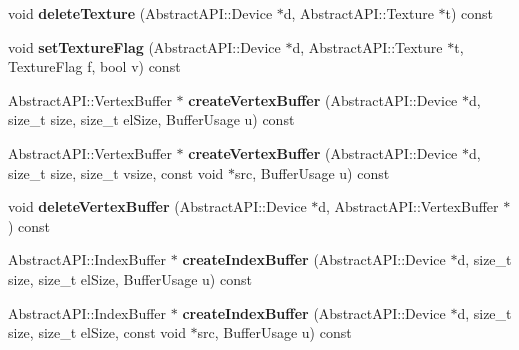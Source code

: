 \begin{DoxyCompactItemize}
\item 
\hypertarget{class_tempest_1_1_opengl2x_a1e61e5565ae0d41370f3d30287b82dc3}{void {\bfseries delete\+Texture} (Abstract\+A\+P\+I\+::\+Device $\ast$d, Abstract\+A\+P\+I\+::\+Texture $\ast$t) const }\label{class_tempest_1_1_opengl2x_a1e61e5565ae0d41370f3d30287b82dc3}

\item 
\hypertarget{class_tempest_1_1_opengl2x_a0c2cca8f9afba5b5df66366956201579}{void {\bfseries set\+Texture\+Flag} (Abstract\+A\+P\+I\+::\+Device $\ast$d, Abstract\+A\+P\+I\+::\+Texture $\ast$t, Texture\+Flag f, bool v) const }\label{class_tempest_1_1_opengl2x_a0c2cca8f9afba5b5df66366956201579}

\item 
\hypertarget{class_tempest_1_1_opengl2x_ad58d3ef2c5c9e339385baa578b747f65}{Abstract\+A\+P\+I\+::\+Vertex\+Buffer $\ast$ {\bfseries create\+Vertex\+Buffer} (Abstract\+A\+P\+I\+::\+Device $\ast$d, size\+\_\+t size, size\+\_\+t el\+Size, Buffer\+Usage u) const }\label{class_tempest_1_1_opengl2x_ad58d3ef2c5c9e339385baa578b747f65}

\item 
\hypertarget{class_tempest_1_1_opengl2x_a7e9c94793fded224eb433507912f7fd4}{Abstract\+A\+P\+I\+::\+Vertex\+Buffer $\ast$ {\bfseries create\+Vertex\+Buffer} (Abstract\+A\+P\+I\+::\+Device $\ast$d, size\+\_\+t size, size\+\_\+t vsize, const void $\ast$src, Buffer\+Usage u) const }\label{class_tempest_1_1_opengl2x_a7e9c94793fded224eb433507912f7fd4}

\item 
\hypertarget{class_tempest_1_1_opengl2x_ab2cbfd059ca938672175a7e3dfb29e7d}{void {\bfseries delete\+Vertex\+Buffer} (Abstract\+A\+P\+I\+::\+Device $\ast$d, Abstract\+A\+P\+I\+::\+Vertex\+Buffer $\ast$) const }\label{class_tempest_1_1_opengl2x_ab2cbfd059ca938672175a7e3dfb29e7d}

\item 
\hypertarget{class_tempest_1_1_opengl2x_a1dc921cca8e1834e334893f1930dd52d}{Abstract\+A\+P\+I\+::\+Index\+Buffer $\ast$ {\bfseries create\+Index\+Buffer} (Abstract\+A\+P\+I\+::\+Device $\ast$d, size\+\_\+t size, size\+\_\+t el\+Size, Buffer\+Usage u) const }\label{class_tempest_1_1_opengl2x_a1dc921cca8e1834e334893f1930dd52d}

\item 
\hypertarget{class_tempest_1_1_opengl2x_aad2470e8acfd34eb9f53716ddb353e46}{Abstract\+A\+P\+I\+::\+Index\+Buffer $\ast$ {\bfseries create\+Index\+Buffer} (Abstract\+A\+P\+I\+::\+Device $\ast$d, size\+\_\+t size, size\+\_\+t el\+Size, const void $\ast$src, Buffer\+Usage u) const }\label{class_tempest_1_1_opengl2x_aad2470e8acfd34eb9f53716ddb353e46}


\end{DoxyCompactItemize}

